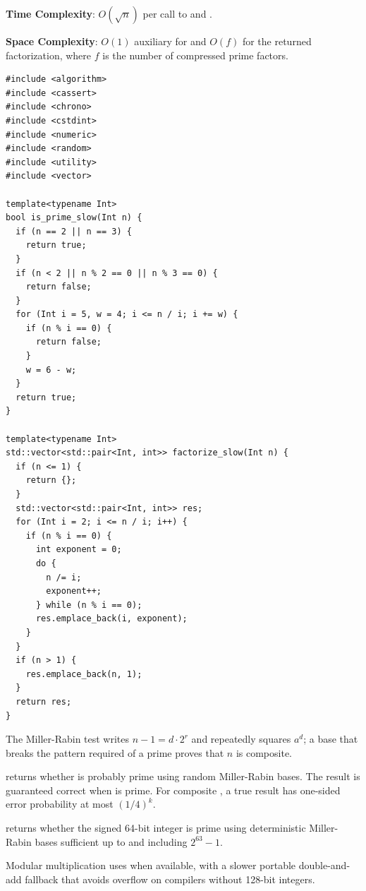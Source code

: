 \textbf{Time Complexity}: $O(\sqrt{n})$ per call to  and .

\textbf{Space Complexity}: $O(1)$ auxiliary for  and $O(f)$ for the returned factorization, where $f$ is the number of compressed prime factors.

\begin{lstlisting}[style=cpp]
#include <algorithm>
#include <cassert>
#include <chrono>
#include <cstdint>
#include <numeric>
#include <random>
#include <utility>
#include <vector>

template<typename Int>
bool is_prime_slow(Int n) {
  if (n == 2 || n == 3) {
    return true;
  }
  if (n < 2 || n % 2 == 0 || n % 3 == 0) {
    return false;
  }
  for (Int i = 5, w = 4; i <= n / i; i += w) {
    if (n % i == 0) {
      return false;
    }
    w = 6 - w;
  }
  return true;
}

template<typename Int>
std::vector<std::pair<Int, int>> factorize_slow(Int n) {
  if (n <= 1) {
    return {};
  }
  std::vector<std::pair<Int, int>> res;
  for (Int i = 2; i <= n / i; i++) {
    if (n % i == 0) {
      int exponent = 0;
      do {
        n /= i;
        exponent++;
      } while (n % i == 0);
      res.emplace_back(i, exponent);
    }
  }
  if (n > 1) {
    res.emplace_back(n, 1);
  }
  return res;
}
\end{lstlisting}
The Miller-Rabin test writes $n - 1 = d \cdot 2^r$ and repeatedly squares $a^d$; a base that breaks the pattern required of a prime proves that $n$ is composite.

\begin{compactitem}
  \item {} returns whether  is probably prime using  random Miller-Rabin bases. The result is guaranteed correct when  is prime. For composite , a true result has one-sided error probability at most $(1 / 4)^k$.
  \item {} returns whether the signed 64-bit integer  is prime using deterministic Miller-Rabin bases sufficient up to and including $2^{63} - 1$.
\end{compactitem}

Modular multiplication uses  when available, with a slower portable double-and-add fallback that avoids overflow on compilers without 128-bit integers.

